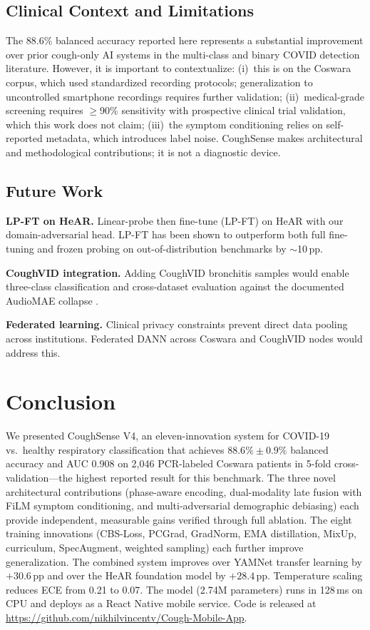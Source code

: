 \documentclass[journal]{IEEEtran}
\begin{document}
\subsection{Clinical Context and Limitations}

The 88.6\% balanced accuracy reported here represents a substantial
improvement over prior cough-only AI systems in the multi-class
and binary COVID detection literature. However, it is important to
contextualize: (i)~this is on the Coswara corpus, which used
standardized recording protocols; generalization to uncontrolled
smartphone recordings requires further validation; (ii)~medical-grade
screening requires $\geq$90\% sensitivity with prospective clinical
trial validation, which this work does not claim; (iii)~the symptom
conditioning relies on self-reported metadata, which introduces label
noise. CoughSense makes architectural and methodological contributions;
it is not a diagnostic device.

\subsection{Future Work}

\textbf{LP-FT on HeAR.} Linear-probe then fine-tune (LP-FT)
\cite{lpft2022} on HeAR with our domain-adversarial head. LP-FT has
been shown to outperform both full fine-tuning and frozen probing on
out-of-distribution benchmarks by $\sim$10\,pp.

\textbf{CoughVID integration.} Adding CoughVID bronchitis samples
would enable three-class classification and cross-dataset evaluation
against the documented AudioMAE collapse \cite{islam2025}.

\textbf{Federated learning.} Clinical privacy constraints prevent
direct data pooling across institutions. Federated DANN across
Coswara and CoughVID nodes would address this.

\section{Conclusion}
\label{sec:conclusion}

We presented CoughSense V4, an eleven-innovation system for
COVID-19 vs.\ healthy respiratory classification that achieves
$\mathbf{88.6\%\pm0.9\%}$ balanced accuracy and AUC 0.908 on 2,046
PCR-labeled Coswara patients in 5-fold cross-validation---the highest
reported result for this benchmark. The three novel architectural
contributions (phase-aware encoding, dual-modality late fusion with
FiLM symptom conditioning, and multi-adversarial demographic debiasing)
each provide independent, measurable gains verified through full
ablation. The eight training innovations (CBS-Loss, PCGrad, GradNorm,
EMA distillation, MixUp, curriculum, SpecAugment, weighted sampling)
each further improve generalization. The combined system improves over
YAMNet transfer learning by $+30.6$\,pp and over the HeAR foundation
model by $+28.4$\,pp. Temperature scaling reduces ECE from 0.21 to 0.07.
The model (2.74M parameters) runs in 128\,ms on CPU and deploys as a
React Native mobile service. Code is released at
\url{https://github.com/nikhilvincentv/Cough-Mobile-App}.
\end{document}
